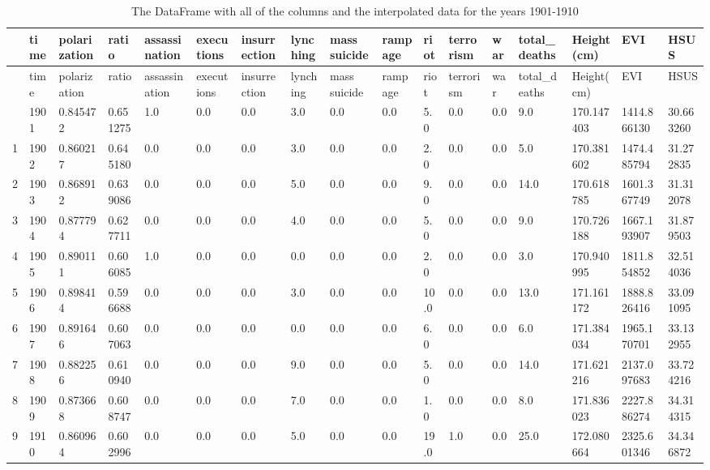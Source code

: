 \documentclass[
  letterpaper,
  DIV=11,
  numbers=noendperiod]{scrartcl}
\begin{document}
\label{timefilter-2}
\begin{longtable}[]{@{}lllllllllllllllll@{}}
\caption{The DataFrame with all of the columns and the interpolated data
for the years 1901-1910}\tabularnewline
\toprule\noalign{}
& time & polarization & ratio & assassination & executions &
insurrection & lynching & mass suicide & rampage & riot & terrorism &
war & total\_deaths & Height(cm) & EVI & HSUS \\
\midrule\noalign{}
\endfirsthead
\toprule\noalign{}
& time & polarization & ratio & assassination & executions &
insurrection & lynching & mass suicide & rampage & riot & terrorism &
war & total\_deaths & Height(cm) & EVI & HSUS \\
\midrule\noalign{}
\endhead
\bottomrule\noalign{}
\endlastfoot
0 & 1901 & 0.845472 & 0.651275 & 1.0 & 0.0 & 0.0 & 3.0 & 0.0 & 0.0 & 5.0
& 0.0 & 0.0 & 9.0 & 170.147403 & 1414.866130 & 30.663260 \\
1 & 1902 & 0.860217 & 0.645180 & 0.0 & 0.0 & 0.0 & 3.0 & 0.0 & 0.0 & 2.0
& 0.0 & 0.0 & 5.0 & 170.381602 & 1474.485794 & 31.272835 \\
2 & 1903 & 0.868912 & 0.639086 & 0.0 & 0.0 & 0.0 & 5.0 & 0.0 & 0.0 & 9.0
& 0.0 & 0.0 & 14.0 & 170.618785 & 1601.367749 & 31.312078 \\
3 & 1904 & 0.877794 & 0.627711 & 0.0 & 0.0 & 0.0 & 4.0 & 0.0 & 0.0 & 5.0
& 0.0 & 0.0 & 9.0 & 170.726188 & 1667.193907 & 31.879503 \\
4 & 1905 & 0.890111 & 0.606085 & 1.0 & 0.0 & 0.0 & 0.0 & 0.0 & 0.0 & 2.0
& 0.0 & 0.0 & 3.0 & 170.940995 & 1811.854852 & 32.514036 \\
5 & 1906 & 0.898414 & 0.596688 & 0.0 & 0.0 & 0.0 & 3.0 & 0.0 & 0.0 &
10.0 & 0.0 & 0.0 & 13.0 & 171.161172 & 1888.826416 & 33.091095 \\
6 & 1907 & 0.891646 & 0.607063 & 0.0 & 0.0 & 0.0 & 0.0 & 0.0 & 0.0 & 6.0
& 0.0 & 0.0 & 6.0 & 171.384034 & 1965.170701 & 33.132955 \\
7 & 1908 & 0.882256 & 0.610940 & 0.0 & 0.0 & 0.0 & 9.0 & 0.0 & 0.0 & 5.0
& 0.0 & 0.0 & 14.0 & 171.621216 & 2137.097683 & 33.724216 \\
8 & 1909 & 0.873668 & 0.608747 & 0.0 & 0.0 & 0.0 & 7.0 & 0.0 & 0.0 & 1.0
& 0.0 & 0.0 & 8.0 & 171.836023 & 2227.886274 & 34.314315 \\
9 & 1910 & 0.860964 & 0.602996 & 0.0 & 0.0 & 0.0 & 5.0 & 0.0 & 0.0 &
19.0 & 1.0 & 0.0 & 25.0 & 172.080664 & 2325.601346 & 34.346872 \\
\end{longtable}
\end{document}
